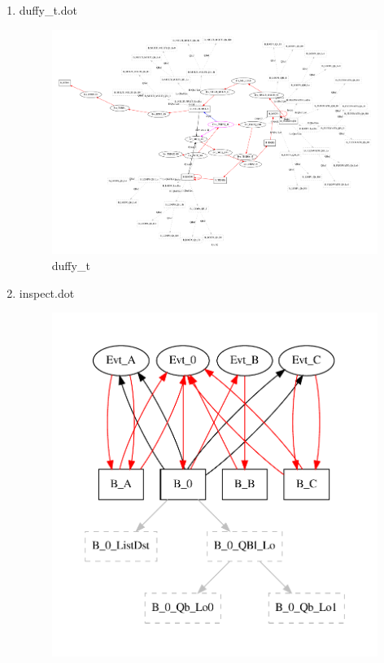 \documentclass[12pt,a4paper]{report}
\begin{document}
\begin{enumerate}
\item duffy\_t.dot
    \begin{figure}
        \centering 
        \includegraphics*[width=1.0\textwidth,keepaspectratio]{TestPattern/duffy_t.pdf}
        \caption{duffy\_t}
        \label{fig:duffy_t}
    \end{figure}
\item inspect.dot
    \begin{figure}
        \centering 
        \includegraphics*[width=1.0\textwidth,keepaspectratio]{TestPattern/inspect.pdf}

\end{figure}
\end{enumerate}
\end{document}
